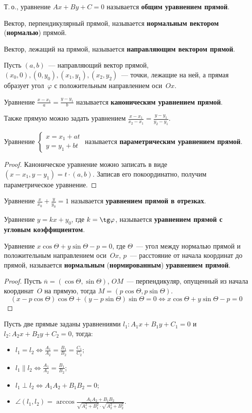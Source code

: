  Т.\,о., уравнение $Ax + By + C = 0$ называется \textbf{общим уравнением прямой}.

 Вектор, перпендикулярный прямой, называется \textbf{нормальным вектором} (\textbf{нормалью}) прямой.

Вектор, лежащий на прямой, называется \textbf{направляющим вектором прямой}.

Пусть $(a, b)$~--- направляющий вектор прямой, $(x_0, 0), (0, y_0), (x_1, y_1), (x_2, y_2)$~--- точки, лежащие на ней, а прямая образует угол~$\varphi$ с положительным направлением оси~$Ox$.

Уравнение $\frac{x - x_1}a = \frac{y - y_1}b$ называется \textbf{каноническим уравнением прямой}.

Также прямую можно задать уравнением $\frac{x - x_1}{x_2 - x_1} = \frac{y - y_1}{y_2 - y_1}$.

Уравнение
$\begin{cases}
x = x_1 + at \\
y = y_1 + bt
\end{cases}$ называется \textbf{параметрическим уравнением прямой}.
\begin{proof}
Каноническое уравнение можно записать в виде $(x - x_1, y - y_1) = t \cdot (a, b)$.
Записав его покоординатно, получим параметрическое уравнение.
\end{proof}

Уравнение $\frac{x}{x_0} + \frac{y}{y_0} = 1$ называется \textbf{уравнением прямой в отрезках}.

Уравнение $y = kx + y_0$, где $k = \tg \varphi$, называется \textbf{уравнением прямой с угловым коэффициентом}.

Уравнение $x \cos \Theta + y \sin \Theta - p = 0$, где $\Theta$~--- угол между нормалью прямой и положительным направлением оси~$Ox$, $p$~--- расстояние от начала координат до прямой, называется \textbf{нормальным} (\textbf{нормированным}) \textbf{уравнением прямой}.
\begin{proof}
Пусть $\overline n = (\cos \Theta, \sin \Theta)$, $OM$~--- перпендикуляр, опущенный из начала координат~$O$ на прямую, тогда $M = (p \cos \Theta, p \sin \Theta)$.
\begin{equation*}
(x - p \cos \Theta) \cos \Theta + (y - p \sin \Theta) \sin \Theta = 0 \Leftrightarrow
x \cos \Theta + y \sin \Theta - p = 0
\end{equation*}
\end{proof}

Пусть две прямые заданы уравнениями $l_1 \colon A_1 x + B_1 y + C_1 = 0$ и $l_2 \colon A_2 x + B_2 y + C_2 = 0$, тогда:
\begin{itemize}
	\item $\displaystyle l_1 = l_2 \Leftrightarrow \frac{A_1}{A_2} = \frac{B_1}{B_2} = \frac{C_1}{C_2}$;
	\item $\displaystyle l_1 \parallel l_2 \Leftrightarrow \frac{A_1}{A_2} = \frac{B_1}{B_2}$;
	\item $\displaystyle l_1 \perp l_2 \Leftrightarrow A_1 A_2 + B_1 B_2 = 0$;
	\item $\displaystyle \angle(l_1, l_2) = \arccos \frac{A_1 A_2 + B_1 B_2}{\sqrt{A_1^2 + B_1^2} \cdot \sqrt{A_2^2 + B_2^2}}$.
\end{itemize}

